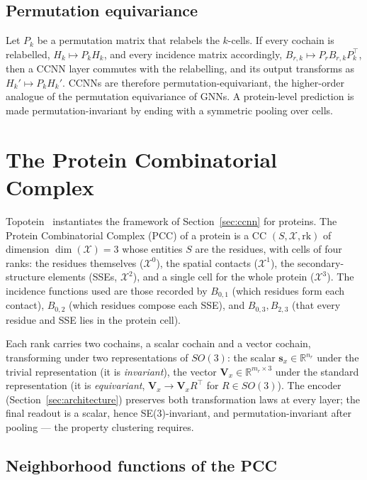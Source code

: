 \documentclass[11pt,a4paper]{article}
\theoremstyle{definition}
\begin{document}
\subsection{Permutation equivariance}

Let $P_k$ be a permutation matrix that relabels the $k$-cells. If every cochain is
relabelled, $H_k\mapsto P_kH_k$, and every incidence matrix accordingly,
$B_{r,k}\mapsto P_rB_{r,k}P_k^{\top}$, then a CCNN layer commutes with the
relabelling, and its output transforms as $H_k'\mapsto P_kH_k'$. CCNNs are
therefore permutation-equivariant, the higher-order analogue of the permutation
equivariance of GNNs. A protein-level prediction is made permutation-invariant by
ending with a symmetric pooling over cells.

\section{The Protein Combinatorial Complex}
\label{sec:pccnn}

Topotein~\cite{topotein} instantiates the framework of
Section~\ref{sec:ccnn} for proteins. The Protein Combinatorial Complex (PCC) of a
protein is a CC $(S,\mathcal{X},\mathrm{rk})$ of dimension $\dim(\mathcal{X})=3$
whose entities $S$ are the residues, with cells of four ranks: the residues
themselves ($\mathcal{X}^{0}$), the spatial contacts ($\mathcal{X}^{1}$), the
secondary-structure elements (SSEs, $\mathcal{X}^{2}$), and a single cell for the
whole protein ($\mathcal{X}^{3}$). The incidence functions used are those recorded
by $B_{0,1}$ (which residues form each contact), $B_{0,2}$ (which residues compose
each SSE), and $B_{0,3},B_{2,3}$ (that every residue and SSE lies in the protein
cell).

Each rank carries two cochains, a scalar cochain and a vector cochain, transforming
under two representations of $SO(3)$: the scalar $\mathbf{s}_{x}\in\mathbb{R}^{n_r}$
under the trivial representation (it is \emph{invariant}), the vector
$\mathbf{V}_{x}\in\mathbb{R}^{m_r\times 3}$ under the standard representation (it is
\emph{equivariant}, $\mathbf{V}_{x}\to\mathbf{V}_{x}R^{\top}$ for $R\in SO(3)$). The
encoder (Section~\ref{sec:architecture}) preserves both transformation laws at every
layer; the final readout is a scalar, hence SE(3)-invariant, and
permutation-invariant after pooling --- the property clustering requires.

\subsection{Neighborhood functions of the PCC}
\label{sec:pcc-neigh}
\end{document}
